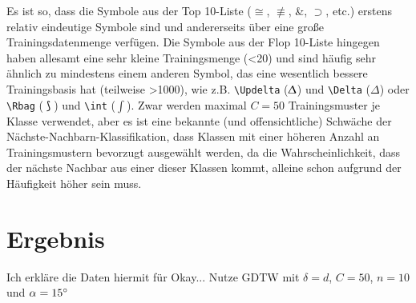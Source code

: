 Es ist so, dass die Symbole aus der Top 10-Liste ($\cong$, $\not\equiv$, \&, $\supset$, etc.) erstens relativ eindeutige Symbole sind und andererseits über eine große Trainingsdatenmenge verfügen. Die Symbole aus der Flop 10-Liste hingegen haben allesamt eine sehr kleine Trainingsmenge (<20) und sind häufig sehr ähnlich zu mindestens einem anderen Symbol, das eine wesentlich bessere Trainingsbasis hat (teilweise >1000), wie z.B. \verb!\Updelta! ($\Updelta$) und \verb!\Delta! ($\Delta$) oder \verb!\Rbag! ($\Rbag$) und \verb!\int! ($\int$). Zwar werden maximal $C=50$ Trainingsmuster je Klasse verwendet, aber es ist eine bekannte (und offensichtliche) Schwäche der Nächste-Nachbarn-Klassifikation, dass Klassen mit einer höheren Anzahl an Trainingsmustern bevorzugt ausgewählt werden, da die Wahrscheinlichkeit, dass der nächste Nachbar aus einer dieser Klassen kommt, alleine schon aufgrund der Häufigkeit höher sein muss.

\section{Ergebnis}

\TODO Ich erkläre die Daten hiermit für Okay...
\TODO Nutze GDTW mit $\delta=d$, $C=50$, $n=10$ und $\alpha=15\degree$